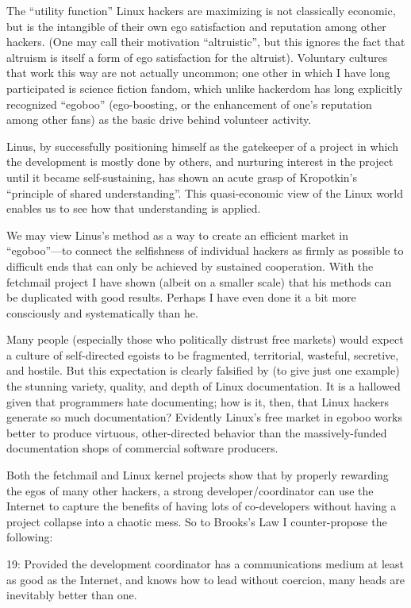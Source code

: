 \documentclass[a4paper,12pt,UTF8,twoside]{ctexbook}
\begin{document}
The ``utility function'' Linux hackers are maximizing is not classically economic, but is the intangible of their own ego satisfaction and reputation among other hackers. (One may call their motivation ``altruistic'', but this ignores the fact that altruism is itself a form of ego satisfaction for the altruist). Voluntary cultures that work this way are not actually uncommon; one other in which I have long participated is science fiction fandom, which unlike hackerdom has long explicitly recognized ``egoboo'' (ego-boosting, or the enhancement of one's reputation among other fans) as the basic drive behind volunteer activity.

Linus, by successfully positioning himself as the gatekeeper of a project in which the development is mostly done by others, and nurturing interest in the project until it became self-sustaining, has shown an acute grasp of Kropotkin's ``principle of shared understanding''. This quasi-economic view of the Linux world enables us to see how that understanding is applied.

We may view Linus's method as a way to create an efficient market in ``egoboo''—to connect the selfishness of individual hackers as firmly as possible to difficult ends that can only be achieved by sustained cooperation. With the fetchmail project I have shown (albeit on a smaller scale) that his methods can be duplicated with good results. Perhaps I have even done it a bit more consciously and systematically than he.

Many people (especially those who politically distrust free markets) would expect a culture of self-directed egoists to be fragmented, territorial, wasteful, secretive, and hostile. But this expectation is clearly falsified by (to give just one example) the stunning variety, quality, and depth of Linux documentation. It is a hallowed given that programmers hate documenting; how is it, then, that Linux hackers generate so much documentation? Evidently Linux's free market in egoboo works better to produce virtuous, other-directed behavior than the massively-funded documentation shops of commercial software producers.

Both the fetchmail and Linux kernel projects show that by properly rewarding the egos of many other hackers, a strong developer/coordinator can use the Internet to capture the benefits of having lots of co-developers without having a project collapse into a chaotic mess. So to Brooks's Law I counter-propose the following:

19: Provided the development coordinator has a communications medium at least as good as the Internet, and knows how to lead without coercion, many heads are inevitably better than one.
\end{document}
